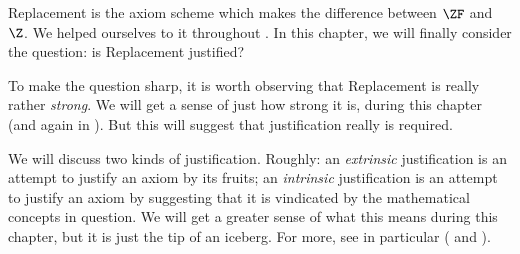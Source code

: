 \documentclass[../../../include/open-logic-section]{subfiles}
\begin{document}

Replacement is the axiom scheme which makes the difference between $\ZF$
and~$\Z$. We helped ourselves to it throughout
. In this chapter, we
will finally consider the question: is Replacement justified? 

To make the question sharp, it is worth observing that Replacement is really
rather \emph{strong}. We will get a sense of just how strong it is, during this chapter (and again in ). But this will suggest that justification really is required. 

We will discuss two kinds of justification. Roughly: an \emph{extrinsic} justification is an attempt to justify an axiom by its fruits; an \emph{intrinsic} justification is an attempt to justify an axiom by suggesting that it is vindicated by the mathematical concepts in question. We will get a greater sense of what this means during this chapter, but it is just the tip of an iceberg. For more, see in particular \citeauthor{Maddy1988a} (\citeyear{Maddy1988a} and \citeyear{Maddy1988b}).
\end{document}
